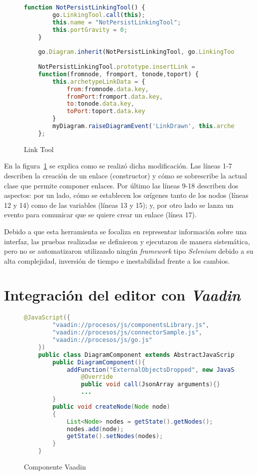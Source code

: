 
\begin{figure}[H]
	\centering
	\begin{lstlisting}[language=Javascript]
	function NotPersistLinkingTool() {
		go.LinkingTool.call(this);
		this.name = "NotPersistLinkingTool";
		this.portGravity = 0;
	}
	
	go.Diagram.inherit(NotPersistLinkingTool, go.LinkingTool);
	
	NotPersistLinkingTool.prototype.insertLink =
	function(fromnode, fromport, tonode,toport) {
		this.archetypeLinkData = {
			from:fromnode.data.key,
			fromPort:fromport.data.key,
			to:tonode.data.key,
			toPort:toport.data.key
		}
		myDiagram.raiseDiagramEvent('LinkDrawn', this.archetypeLinkData);
	};\end{lstlisting}
	\caption{Link Tool}
	\label{fig:linkTool}
\end{figure}


En la figura~\ref{fig:linkTool} se explica como se realizó dicha modificación. Las líneas 1-7 describen la creación de un enlace (constructor) y cómo se sobrescribe la actual clase que permite componer enlaces. Por último las líneas 9-18 describen dos aspectos: por un lado, cómo se establecen los orígenes tanto de los nodos (líneas 12 y 14) como de las variables (líneas 13 y 15); y, por otro lado se lanza un evento para comunicar que se quiere crear un enlace (línea 17).

Debido a que esta herramienta se focaliza en representar información sobre una interfaz, las pruebas realizadas se definieron y ejecutaron de manera sistemática, pero no se automatizaron utilizando ningún \emph{framework} tipo \emph{Selenium} debido a su alta complejidad, inversión de tiempo e inestabilidad frente a los cambios.

\section{Integración del editor con \emph{Vaadin}}

\begin{figure}[H]
	\centering
	\begin{lstlisting}[language=Java]
	@JavaScript({
		"vaadin://procesos/js/componentsLibrary.js",
		"vaadin://procesos/js/connectorSample.js",
		"vaadin://procesos/js/go.js"
	})
	public class DiagramComponent extends AbstractJavaScriptComponent{
		public DiagramComponent(){
			addFunction("ExternalObjectsDropped", new JavaScriptFunction(){
				@Override
				public void call(JsonArray arguments){}
				...
		}
		public void createNode(Node node)
		{
			List<Node> nodes = getState().getNodes();
			nodes.add(node);
			getState().setNodes(nodes);
		}
	}\end{lstlisting}
	\caption{Componente Vaadin}
	\label{fig:vaadinComponent}
\end{figure}


